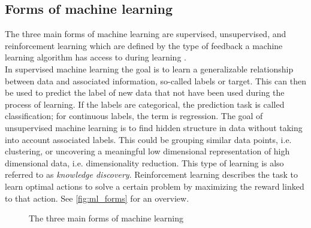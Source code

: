 \subsection{Forms of machine learning}
The three main forms of machine learning are supervised, unsupervised, and reinforcement learning which are defined by the type of feedback a machine learning algorithm has access to during learning \cite{Shalev2014}.\\
In supervised machine learning the goal is to learn a generalizable relationship between data and associated information, so-called labels or target. This can then be used to predict the label of new data that not have been used during the process of learning. If the labels are categorical, the prediction task is called classification; for continuous labels, the term is regression. The goal of unsupervised machine learning is to find hidden structure in data without taking into account associated labels. This could be grouping similar data points, i.e. clustering, or uncovering a meaningful low dimensional representation of high dimensional data, i.e. dimensionality reduction. This type of learning is also referred to as \textit{knowledge discovery}\cite{Murphy2012}. Reinforcement learning describes the task to learn optimal actions to solve a certain problem by maximizing the reward linked to that action. See \autoref{fig:ml_forms} for an overview.

\begin{figure}[h]
\begin{center}
\end{center}
\caption[The three main forms of machine learning]{The three main forms of machine learning}
\label{fig:ml_forms}
\end{figure}

